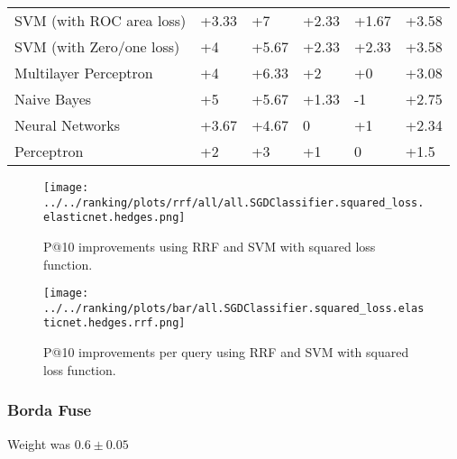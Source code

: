 \begin{table}[h!]
{\begin{tabular}{@{}llllll@{}}
SVM (with ROC area loss)                                                                    & +3.33                    & +7                          & +2.33                    & +1.67                       & +3.58             \\ 
SVM (with Zero/one loss)                                                                        & +4                       & +5.67                       & +2.33                    & +2.33                       & +3.58             \\ 
Multilayer Perceptron								& +4 & +6.33 & +2 & +0 & +3.08 \\
Naive Bayes                                                                      & +5                       & +5.67                       & +1.33                    & -1                         & +2.75             \\ 
Neural Networks                                                                   & +3.67                    & +4.67                       & 0                       & +1                          & +2.34             \\ 
Perceptron                                                              & +2                       & +3                          & +1                       & 0                          & +1.5              \\ \bottomrule
\end{tabular}%
}
\end{table}

\begin{figure}[h!]
\centerline{
  \texttt{[image: ../../ranking/plots/rrf/all/all.SGDClassifier.squared\_loss.elasticnet.hedges.png]}
  }
  \caption{P@10 improvements using RRF and SVM with squared loss function.}
\end{figure}

\begin{figure}
\centerline{
  \texttt{[image: ../../ranking/plots/bar/all.SGDClassifier.squared\_loss.elasticnet.hedges.rrf.png]}
  }
  \caption{P@10 improvements per query using RRF and SVM with squared loss function.}
\end{figure}



\subsubsection{Borda Fuse}
Weight was $0.6\pm0.05$

